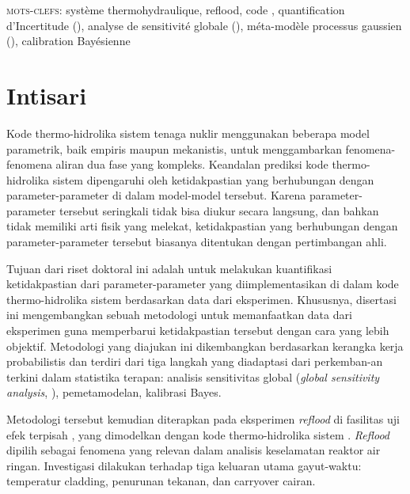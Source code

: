 \begin{otherlanguage}{ngerman}
\vfill

\textsc{mots-clefs}:
système thermohydraulique,
reflood,
code ,
quantification d'Incertitude (),
analyse de sensitivité globale (),
méta-modèle processus gaussien (),
calibration Bayésienne

\end{otherlanguage}

\newpage

\chapter*{Intisari}

Kode thermo-hidrolika sistem tenaga nuklir menggunakan beberapa model parametrik, baik empiris maupun mekanistis, untuk menggambarkan fenomena-fenomena aliran dua fase yang kompleks.   
Keandalan prediksi kode thermo-hidrolika sistem dipengaruhi oleh ketidakpastian yang berhubungan dengan parameter-parameter di dalam model-model tersebut.
Karena parameter-parameter tersebut seringkali tidak bisa diukur secara langsung, dan bahkan tidak memiliki arti fisik yang melekat, ketidakpastian yang berhubungan dengan parame\-ter-parameter tersebut biasanya ditentukan dengan pertimbangan ahli.

Tujuan dari riset doktoral ini adalah untuk melakukan kuantifikasi ketidakpastian dari parameter-parameter yang diimplementasikan di dalam kode thermo-hidrolika sistem berdasarkan data dari eksperimen.
Khususnya, disertasi ini mengembangkan sebuah metodologi untuk memanfaatkan data dari eksperimen guna memperbarui ketidakpastian tersebut dengan cara yang lebih objektif.
Metodologi yang diajukan ini dikembangkan berdasarkan kerangka kerja probabilistis dan terdiri dari tiga langkah yang diadaptasi dari perkemban-an terkini dalam statistika terapan: analisis sensitivitas global (\emph{global sensitivity analysis}, ), pemetamodelan, kalibrasi Bayes.

Metodologi tersebut kemudian diterapkan pada eksperimen \emph{reflood} di fasilitas uji efek terpisah , yang dimodelkan dengan kode thermo-hidrolika sistem .
\emph{Reflood} dipilih sebagai fenomena yang relevan dalam analisis keselamatan reaktor air ringan. 
Investigasi dilakukan terhadap tiga keluaran utama gayut-waktu: temperatur cladding, penurunan tekanan, dan carryover cairan.

